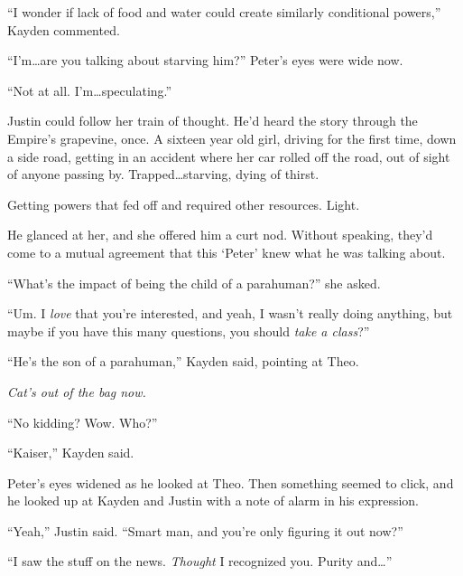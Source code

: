 ``I wonder if lack of food and water could create similarly conditional powers,'' Kayden commented.



``I'm\ldots are you talking about starving him?''  Peter's eyes were wide now.



``Not at all.  I'm\ldots speculating.''



Justin could follow her train of thought.  He'd heard the story through the Empire's grapevine, once.  A sixteen year old girl, driving for the first time, down a side road, getting in an accident where her car rolled off the road, out of sight of anyone passing by.  Trapped\ldots starving, dying of thirst.



Getting powers that fed off and required other resources.  Light.



He glanced at her, and she offered him a curt nod.  Without speaking, they'd come to a mutual agreement that this `Peter' knew what he was talking about.



``What's the impact of being the child of a parahuman?'' she asked.



``Um.  I \emph{love} that you're interested, and yeah, I wasn't really doing anything, but maybe if you have this many questions, you should \emph{take a class}?''



``He's the son of a parahuman,'' Kayden said, pointing at Theo.



\emph{Cat's out of the bag now.}



``No kidding?  Wow.  Who?''



``Kaiser,'' Kayden said.



Peter's eyes widened as he looked at Theo.  Then something seemed to click, and he looked up at Kayden and Justin with a note of alarm in his expression.



``Yeah,'' Justin said.  ``Smart man, and you're only figuring it out now?''



``I saw the stuff on the news.  \emph{Thought} I recognized you.  Purity and\ldots''



